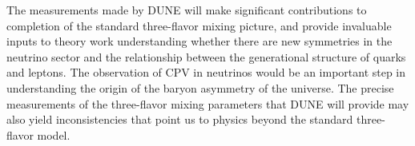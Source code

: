 The measurements made by DUNE will make significant contributions to completion of the standard three-flavor mixing picture, and provide invaluable inputs to theory work understanding whether there are new symmetries in the neutrino sector and the relationship between the generational structure of quarks and leptons. The observation of CPV in neutrinos would be an important step in understanding the origin of the baryon asymmetry of the universe. The precise measurements of the three-flavor mixing parameters that DUNE will provide may also yield inconsistencies that point us to physics beyond the standard three-flavor model.
